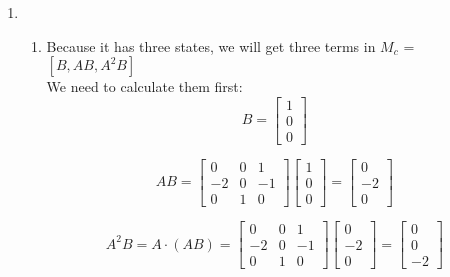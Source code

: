 \documentclass[12pt,a4paper, margin=1in]{article}
\begin{document}
\begin{enumerate}
        
    \item %
        \begin{enumerate}
            \item Because it has three states, we will get three terms in $M_c$ = $[B, AB, A^2B]$\\
            We need to calculate them first:\\
            \begin{equation*}
            B=
            \begin{bmatrix}
                1\\
                0\\
                0
            \end{bmatrix}
            \end{equation*}

            \begin{equation*}
            AB=
            \begin{bmatrix}
                0 & 0 & 1\\
                -2 & 0 & -1\\
                0 & 1 & 0
            \end{bmatrix}
            \begin{bmatrix}
                1\\
                0\\
                0
            \end{bmatrix}=
            \begin{bmatrix}
                0\\
                -2\\
                0
            \end{bmatrix}
            \end{equation*}

            \begin{equation*}
            A^2B=A\cdot(AB)=
            \begin{bmatrix}
                0 & 0 & 1\\
                -2 & 0 & -1\\
                0 & 1 & 0
            \end{bmatrix}
            \begin{bmatrix}
                0\\
                -2\\
                0
            \end{bmatrix}=
            \begin{bmatrix}
                0\\
                0\\
                -2
            \end{bmatrix}
            \end{equation*}


\end{enumerate}
\end{enumerate}
\end{document}
